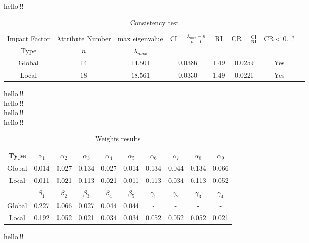 \documentclass[12pt]{article}
\begin{document}
		hello!!! \\

		{
			\fontsize{10}{14}\selectfont
			{
				\begin{longtable}{cccccccc}
					\caption{Consistency test}
					\label{tb:consistency}\\
					
					\toprule
					Impact Factor&Attribute Number&max eigenvalue 
					&\multirow{2}{*}{$\mathrm{CI}=\frac{\lambda_{max}-n}{n-1}$}
					&\multirow{2}{*}{$\mathrm{RI}$}
					&\multirow{2}{*}{$\mathrm{CR}=\frac{\mathrm{CI}}{\mathrm{RI}}$}
					&\multirow{2}{*}{$\mathrm{CR}<0.1?$}\\
					Type&$n$&$\lambda_{max}$\\
					\toprule
					Global&$14$&$14.501$&$0.0386$&$1.49$&0.0259&Yes\\
					Local&$18$&$18.561$&$0.0330$&$1.49$&0.0221&Yes\\
					\bottomrule
				\end{longtable}
			}
		}	

	hello!!! \\
	hello!!! \\
	hello!!! \\
	hello!!! \\
	
		{
			\fontsize{10}{14}\selectfont
			{
				\begin{longtable}{c|ccccccccc}
					\caption{Weights results}
					\label{tb:weights}\\
					
					\toprule
					Type&$\alpha_1$&$\alpha_2$&$\alpha_3$&$\alpha_4$&$\alpha_5$&$\alpha_6$&$\alpha_7$&$\alpha_8$&$\alpha_9$\\
					\toprule
					Global&0.014&0.027&0.134&0.027&0.014&0.134&0.044&0.134&0.066\\
					Local&0.011&0.021&0.113&0.021&0.011&0.113&0.034&0.113&0.052\\
					\toprule
					\toprule
					&$\beta_1$&$\beta_2$&$\beta_3$&$\beta_4$&$\beta_5$&$\gamma_1$&$\gamma_2$&$\gamma_3$&$\gamma_4$\\
					\toprule
					Global&0.227&0.066&0.027&0.044&0.044&-&-&-&-\\
					Local&0.192&0.052&0.021&0.034&0.034&0.052&0.052&0.052&0.021\\
					\bottomrule
				\end{longtable}
			}
		}	
	
		hello!!! \\
		
\end{document}
